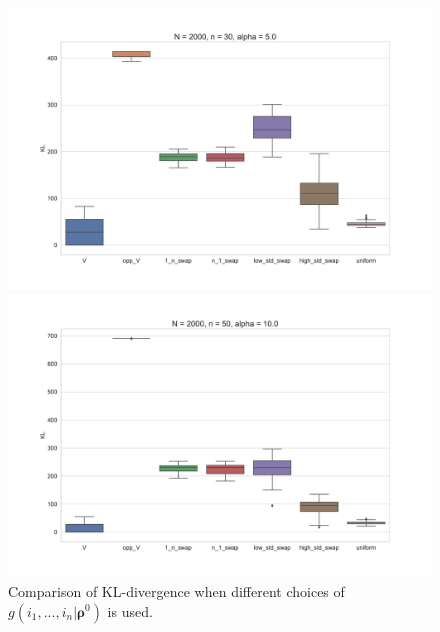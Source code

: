 \documentclass[11pt, oneside]{article}   	%
\begin{document}
\begin{figure}[h!]
		\begin{minipage}[t]{.45\textwidth}
			\centering
			\includegraphics[width=\textwidth]{figures/theorem2_2/N2000n30alpha5.pdf}
			
		\end{minipage}
		\hfill
		\begin{minipage}[t]{.45\textwidth}
			\centering
			\includegraphics[width=\textwidth]{figures/theorem2_2/N2000n50alpha10.pdf}
			
		\end{minipage} 
	
	
	\caption{Comparison of KL-divergence when different choices of $g(i_1, ...,i_n|\bm{\rho}^0)$ is used. }
	\label{fig:boxPlots}
\end{figure}
\end{document}
